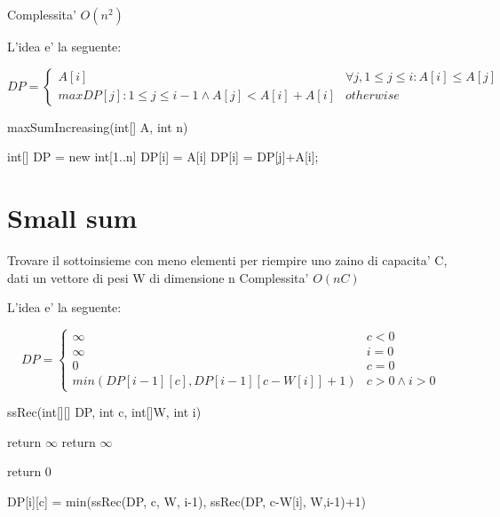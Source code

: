 \documentclass[oneside]{book}
\begin{document}
Complessita' $O(n^2)$

L'idea e' la seguente:

\begin{equation}
  DP =
    \begin{cases}
      A[i] & \forall j, 1 \leq j \leq i : A[i] \leq A[j]\\
      max{DP[j]: 1 \leq j \leq i-1 \land A[j] < A[i]}+A[i] & otherwise      
    \end{cases}       
\end{equation}
\begin{algorithm}
\caption{maxSumIncreasing(int[] A, int n)\label{alg:cap}}
\begin{algorithmic}
\State int[] DP = new int[1..n]
	\State DP[i] = A[i]
			\State DP[i] = DP[j]+A[i];
		\EndIf
	\EndFor

\EndFor
\end{algorithmic}
\end{algorithm}
\newpage
\section{Small sum}
Trovare il sottoinsieme con meno elementi per riempire uno zaino di capacita' C, dati un vettore di pesi W di dimensione n
Complessita' $O(nC)$


L'idea e' la seguente:

\begin{equation}
DP = 
	\begin{cases}
		\infty & c < 0 \\
		\infty & i = 0\\
		0 & c = 0 \\
		min(DP[i-1][c],DP[i-1][c-W[i]]+1) & c > 0 \land i > 0
	\end{cases}
\end{equation}

\begin{algorithm}
\caption{ssRec(int[][] DP, int c, int[]W, int i)\label{alg:cap}}
\begin{algorithmic}
	\State return $\infty$
	\State return $\infty$

	\State return 0

\Else
		\State DP[i][c] = min(ssRec(DP, c, W, i-1), ssRec(DP, c-W[i], W,i-1)+1)
	\EndIf
\EndIf
\end{algorithmic}
\end{algorithm}
\end{document}
